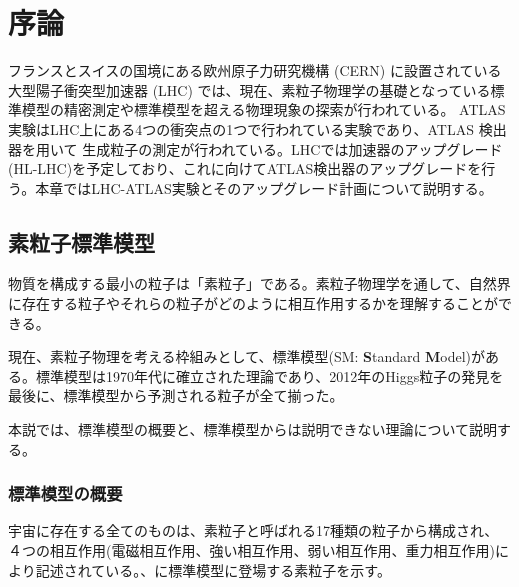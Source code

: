 \chapter{序論}
\label{sec:josho}

フランスとスイスの国境にある欧州原子力研究機構 (CERN) に設置されている大型陽子衝突型加速器 (LHC) では、現在、素粒子物理学の基礎となっている標準模型の精密測定や標準模型を超える物理現象の探索が行われている。 ATLAS実験はLHC上にある4つの衝突点の1つで行われている実験であり、ATLAS 検出器を用いて 生成粒子の測定が行われている。LHCでは加速器のアップグレード(HL-LHC)を予定しており、これに向けてATLAS検出器のアップグレードを行う。本章ではLHC-ATLAS実験とそのアップグレード計画について説明する。



\section{素粒子標準模型 \cite{soryuushi}}
\label{sec:soryuushi}
物質を構成する最小の粒子は「素粒子」である。素粒子物理学を通して、自然界に存在する粒子やそれらの粒子がどのように相互作用するかを理解することができる。

現在、素粒子物理を考える枠組みとして、標準模型(SM: \textbf{S}tandard \textbf{M}odel)がある。標準模型は1970年代に確立された理論であり、2012年のHiggs粒子の発見を最後に、標準模型から予測される粒子が全て揃った。

本説では、標準模型の概要と、標準模型からは説明できない理論について説明する。


\subsection{標準模型の概要}
\label{sec:sm}

宇宙に存在する全てのものは、素粒子と呼ばれる17種類の粒子から構成され、４つの相互作用(電磁相互作用、強い相互作用、弱い相互作用、重力相互作用)により記述されている。、に標準模型に登場する素粒子を示す。


